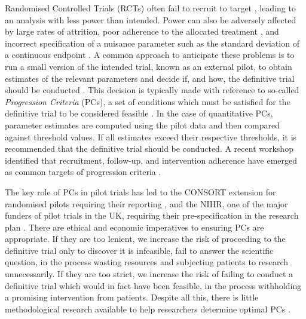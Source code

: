\documentclass[AMA,STIX1COL]{WileyNJD-v2}
\begin{document}
Randomised Controlled Trials (RCTs) often fail to recruit to target \cite{Sully2013}, leading to an analysis with less power than intended. Power can also be adversely affected by large rates of attrition, poor adherence to the allocated treatment \cite{Fay2006}, and incorrect specification of a nuisance parameter such as the standard deviation of a continuous endpoint \cite{Teare2014}. A common approach to anticipate these problems is to run a small version of the intended trial, known as an external pilot, to obtain estimates of the relevant parameters and decide if, and how, the definitive trial should be conducted  \cite{Craig2008, Eldridge2016}. This decision is typically made with reference to so-called \emph{Progression Criteria} (PCs), a set of conditions which must be satisfied for the definitive trial to be considered feasible \cite{Avery2017}. In the case of quantitative PCs, parameter estimates are computed using the pilot data and then compared against threshold values. If all estimates exceed their respective thresholds, it is recommended that the definitive trial should be conducted. A recent workshop identified that recruitment, follow-up, and intervention adherence have emerged as common targets of progression criteria \cite{Avery2017}. 

The key role of PCs in pilot trials has led to the CONSORT extension for randomised pilots requiring their reporting \cite{Eldridge2016a}, and the NIHR, one of the major funders of pilot trials in the UK, requiring their pre-specification in the research plan \cite{NIHR2017}. There are ethical and economic imperatives to ensuring PCs are appropriate. If they are too lenient, we increase the risk of proceeding to the definitive trial only to discover it is infeasible, fail to answer the scientific question, in the process wasting resources and subjecting patients to research unnecessarily. If they are too strict, we increase the risk of failing to conduct a definitive trial which would in fact have been feasible, in the process withholding a promising intervention from patients. Despite all this, there is little methodological research available to help researchers determine optimal PCs \cite{Avery2017}. 

\end{document}
